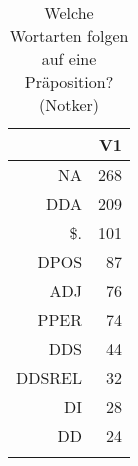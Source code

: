\begin{table}[ht]
\centering
\begin{tabular}{rr}
  \lsptoprule
 & V1 \\ 
  \midrule
NA & 268 \\ 
  DDA & 209 \\ 
  \$. & 101 \\ 
  DPOS &  87 \\ 
  ADJ &  76 \\ 
  PPER &  74 \\ 
  DDS &  44 \\ 
  DDSREL &  32 \\ 
  DI &  28 \\ 
  DD &  24 \\ 
   \lspbottomrule
\end{tabular}
\caption{Welche Wortarten folgen auf eine Präposition?  (Notker)} 
\end{table}
